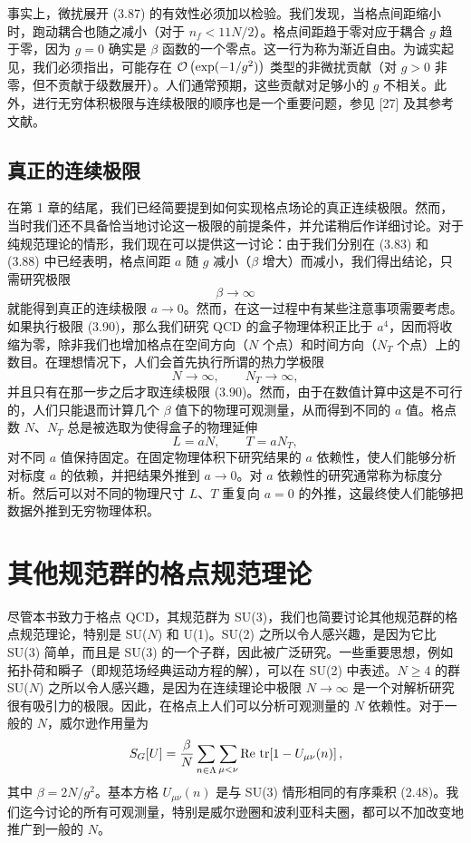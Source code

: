 事实上，微扰展开 (3.87) 的有效性必须加以检验。我们发现，当格点间距缩小时，跑动耦合也随之减小（对于 $n_f < 11N/2$）。格点间距趋于零对应于耦合 $g$ 趋于零，因为 $g = 0$ 确实是 $\beta$ 函数的一个零点。这一行为称为渐近自由。为诚实起见，我们必须指出，可能存在 $\mathcal{O}\left(\exp(-1/g^2)\right)$ 类型的非微扰贡献（对 $g > 0$ 非零，但不贡献于级数展开）。人们通常预期，这些贡献对足够小的 $g$ 不相关。此外，进行无穷体积极限与连续极限的顺序也是一个重要问题，参见 [27] 及其参考文献。

\subsection{真正的连续极限}

在第 1 章的结尾，我们已经简要提到如何实现格点场论的真正连续极限。然而，当时我们还不具备恰当地讨论这一极限的前提条件，并允诺稍后作详细讨论。对于纯规范理论的情形，我们现在可以提供这一讨论：由于我们分别在 (3.83) 和 (3.88) 中已经表明，格点间距 $a$ 随 $g$ 减小（$\beta$ 增大）而减小，我们得出结论，只需研究极限
\begin{equation}
  \beta \to \infty
\end{equation}
就能得到真正的连续极限 $a \to 0$。然而，在这一过程中有某些注意事项需要考虑。如果执行极限 (3.90)，那么我们研究 QCD 的盒子物理体积正比于 $a^4$，因而将收缩为零，除非我们也增加格点在空间方向（$N$ 个点）和时间方向（$N_T$ 个点）上的数目。在理想情况下，人们会首先执行所谓的热力学极限
\begin{equation}
  N \to \infty , \qquad N_T \to \infty ,
\end{equation}
并且只有在那一步之后才取连续极限 (3.90)。然而，由于在数值计算中这是不可行的，人们只能退而计算几个 $\beta$ 值下的物理可观测量，从而得到不同的 $a$ 值。格点数 $N$、$N_T$ 总是被选取为使得盒子的物理延伸
\begin{equation}
  L = a N , \qquad T = a N_T ,
\end{equation}
对不同 $a$ 值保持固定。在固定物理体积下研究结果的 $a$ 依赖性，使人们能够分析对标度 $a$ 的依赖，并把结果外推到 $a \to 0$。对 $a$ 依赖性的研究通常称为标度分析。然后可以对不同的物理尺寸 $L$、$T$ 重复向 $a = 0$ 的外推，这最终使人们能够把数据外推到无穷物理体积。

\section{其他规范群的格点规范理论}

尽管本书致力于格点 QCD，其规范群为 SU(3)，我们也简要讨论其他规范群的格点规范理论，特别是 SU($N$) 和 U(1)。SU(2) 之所以令人感兴趣，是因为它比 SU(3) 简单，而且是 SU(3) 的一个子群，因此被广泛研究。一些重要思想，例如拓扑荷和瞬子（即规范场经典运动方程的解），可以在 SU(2) 中表述。$N \geq 4$ 的群 SU($N$) 之所以令人感兴趣，是因为在连续理论中极限 $N \to \infty$ 是一个对解析研究很有吸引力的极限。因此，在格点上人们可以分析可观测量的 $N$ 依赖性。对于一般的 $N$，威尔逊作用量为
\begin{equation}
  S_G[U] = \frac{\beta}{N}\sum_{n\in\Lambda}\sum_{\mu<\nu}
    \operatorname{Re}\,\operatorname{tr}\!\left[1 - U_{\mu\nu}(n)\right] ,
\end{equation}
其中 $\beta = 2N/g^2$。基本方格 $U_{\mu\nu}(n)$ 是与 SU(3) 情形相同的有序乘积 (2.48)。我们迄今讨论的所有可观测量，特别是威尔逊圈和波利亚科夫圈，都可以不加改变地推广到一般的 $N$。

